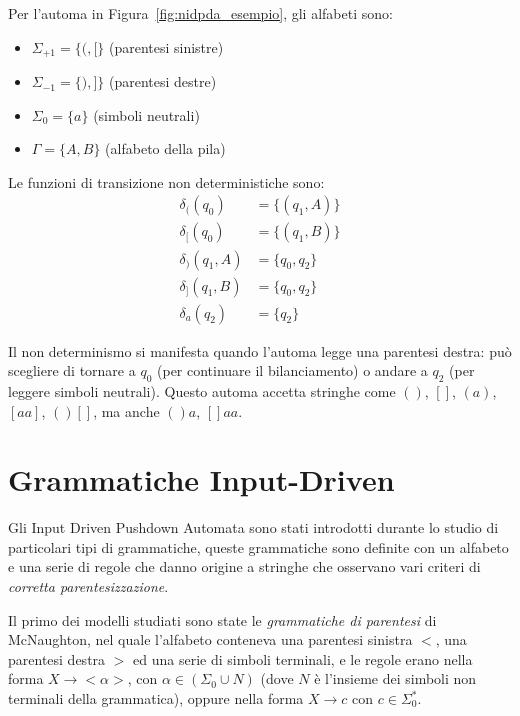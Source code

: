 \documentclass[a4paper,12pt]{report}
\theoremstyle{propositionstyle}
\begin{document}
    Per l'automa in Figura~\ref{fig:nidpda_esempio}, gli alfabeti sono:
    \begin{itemize}
        \item $\Sigma_{+1} = \{(, [\}$ (parentesi sinistre)
        \item $\Sigma_{-1} = \{), ]\}$ (parentesi destre)
        \item $\Sigma_0 = \{a\}$ (simboli neutrali)
        \item $\Gamma = \{A, B\}$ (alfabeto della pila)
    \end{itemize}
    
    Le funzioni di transizione non deterministiche sono:
    \begin{align}
        \delta_{(}(q_0) &= \{(q_1, A)\} \\
        \delta_{[}(q_0) &= \{(q_1, B)\} \\
        \delta_{)}(q_1, A) &= \{q_0, q_2\} \\
        \delta_{]}(q_1, B) &= \{q_0, q_2\} \\
        \delta_{a}(q_2) &= \{q_2\}
    \end{align}
    
    Il non determinismo si manifesta quando l'automa legge una parentesi destra: può scegliere di tornare a $q_0$ (per continuare il bilanciamento) o andare a $q_2$ (per leggere simboli neutrali). Questo automa accetta stringhe come $()$, $[]$, $(a)$, $[aa]$, $()[]$, ma anche $()a$, $[]aa$.

    \section{Grammatiche Input-Driven}

    Gli Input Driven Pushdown Automata sono stati introdotti durante lo studio di particolari tipi di grammatiche, queste grammatiche sono definite
    con un alfabeto e una serie di regole che danno origine a stringhe che osservano vari criteri di \textit{corretta parentesizzazione}.
    
    Il primo dei modelli studiati sono state le \textit{grammatiche di parentesi} di McNaughton, nel quale l'alfabeto conteneva una parentesi sinistra $<$, una parentesi destra $>$
    ed una serie di simboli terminali, e le regole erano nella forma $X \rightarrow <\alpha>$, con $\alpha \in \left(\Sigma_0 \cup N\right)$ (dove $N$ è l'insieme dei simboli non terminali della grammatica), oppure nella forma $X \rightarrow c$ con $c \in \Sigma_0^*$.
    
\end{document}
